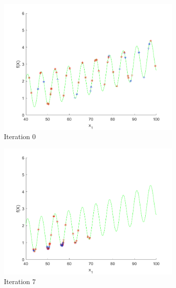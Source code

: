 \begin{figure}
  \centering
 \begin{subfigure}[b]{0.4\textwidth}
   \includegraphics[width=\textwidth]{img/smpl/grwnk1dshft/loa-iter-0}
   \caption{Iteration 0}
   \label{fig:i2-iter-0}
 \end{subfigure}
 \begin{subfigure}[b]{0.4\textwidth}
   \includegraphics[width=\textwidth]{img/smpl/grwnk1dshft/loa-iter-7}
   \caption{Iteration 7}
   \label{fig:i2-iter-1}
 \end{subfigure}
 \begin{subfigure}[b]{0.4\textwidth}

\end{subfigure}
\end{figure}
